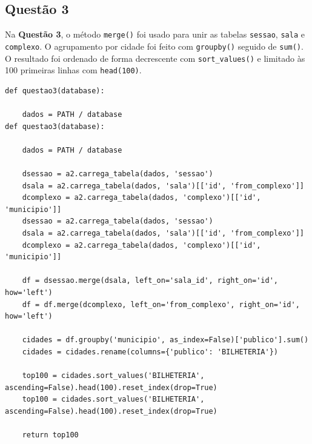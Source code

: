 \documentclass{article}
\begin{document}
\linespread{1.5}
\pagebreak
\subsection*{Questão 3}
Na \textbf{Questão 3}, o método \texttt{merge()} foi usado para unir as tabelas \texttt{sessao}, \texttt{sala} e \texttt{complexo}. O agrupamento por cidade foi feito com \texttt{groupby()} seguido de \texttt{sum()}. O resultado foi ordenado de forma decrescente com \texttt{sort\_values()} e limitado às 100 primeiras linhas com \texttt{head(100)}.
\linespread{1}
\begin{lstlisting}
def questao3(database):

    dados = PATH / database
def questao3(database):

    dados = PATH / database
    
    dsessao = a2.carrega_tabela(dados, 'sessao')
    dsala = a2.carrega_tabela(dados, 'sala')[['id', 'from_complexo']]
    dcomplexo = a2.carrega_tabela(dados, 'complexo')[['id', 'municipio']]
    dsessao = a2.carrega_tabela(dados, 'sessao')
    dsala = a2.carrega_tabela(dados, 'sala')[['id', 'from_complexo']]
    dcomplexo = a2.carrega_tabela(dados, 'complexo')[['id', 'municipio']]

    df = dsessao.merge(dsala, left_on='sala_id', right_on='id', how='left')
    df = df.merge(dcomplexo, left_on='from_complexo', right_on='id', how='left')

    cidades = df.groupby('municipio', as_index=False)['publico'].sum()
    cidades = cidades.rename(columns={'publico': 'BILHETERIA'})

    top100 = cidades.sort_values('BILHETERIA', ascending=False).head(100).reset_index(drop=True)
    top100 = cidades.sort_values('BILHETERIA', ascending=False).head(100).reset_index(drop=True)

    return top100
\end{lstlisting}
\linespread{1.5}
\end{document}
